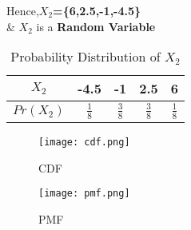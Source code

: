 \documentclass[11pt,a4paper,twocolumn]{article}
\begin{document}
Hence,\textbf{$X_{2}$=\{6,2.5,-1,-4.5\}}\\
\& $X_2$ is a \textbf{Random Variable}
\begin{table}[h!]
    \centering
    \begin{tabular}{|c|c|c|c|c|}
    \hline
         $X_{2}$&-4.5&-1&2.5&6  \\
         \hline
         $Pr(X_{2})$&$\frac{1}{8}$&$\frac{3}{8}$&$\frac{3}{8}$&$\frac{1}{8}$\\
         \hline
    \end{tabular}
    \caption{Probability Distribution of $X_{2}$}
    \label{tab:my_label}
\end{table}
\newpage
\begin{figure}[h!]
    \centering
    \texttt{[image: cdf.png]}
    \caption{CDF}
\end{figure}
\begin{figure}[h!]
    \centering
    \texttt{[image: pmf.png]}
    \caption{PMF}
\end{figure}
\end{document}
